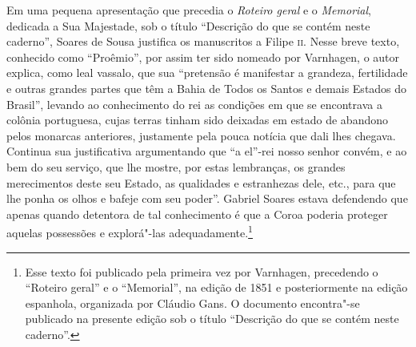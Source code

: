 \documentclass[12pt]{extarticle}
\begin{document}
Em uma pequena apresentação que precedia o \textit{Roteiro geral} e o
\textit{Memorial}, dedicada a Sua Majestade, sob o título ``Descrição do
que se contém neste caderno'', Soares de Sousa justifica os manuscritos a
Filipe 	\textsc{ii}. Nesse breve texto, conhecido como ``Proêmio'', por assim ter
sido nomeado por Varnhagen, o autor explica, como leal vassalo, que sua
``pretensão é manifestar a grandeza, fertilidade e outras grandes partes
que têm a Bahia de Todos os Santos e demais Estados do Brasil'', levando
ao conhecimento do rei as condições em que se encontrava a colônia
portuguesa, cujas terras tinham sido deixadas em estado de abandono
pelos monarcas anteriores, justamente pela pouca notícia que dali lhes
chegava. Continua sua justificativa argumentando que ``a el''-rei nosso
senhor convém, e ao bem do seu serviço, que lhe mostre, por estas
lembranças, os grandes merecimentos deste seu Estado, as qualidades e
estranhezas dele, etc., para que lhe ponha os olhos e bafeje com seu
poder''. Gabriel Soares estava defendendo que apenas quando detentora de
tal conhecimento é que a Coroa poderia proteger aquelas possessões e
explorá"-las adequadamente.\footnote{Esse texto foi publicado pela
primeira vez por Varnhagen, precedendo o “Roteiro geral” e o
“Memorial”, na edição de 1851 e posteriormente na edição espanhola,
organizada por Cláudio Gans. O documento encontra"-se publicado na presente edição
sob o título “Descrição do que se contém neste caderno”.}
\end{document}
